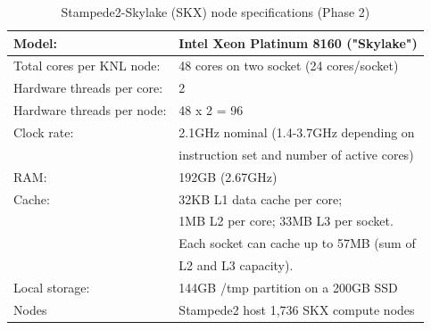 \documentclass{article}
\begin{document}
\begin{table}[!hpt]
\centering
\caption{Stampede2-Skylake (SKX) node specifications (Phase 2)\cite{TACC_Stampede2}}
\begin{tabular}{|l|l|}\hline 
Model:                     & Intel Xeon Platinum 8160 ("Skylake")\\ \hline
Total cores per KNL node:  & 48 cores on two socket (24 cores/socket)\\ \hline
Hardware threads per core: & 2\\\hline 
Hardware threads per node: & 48 x 2 = 96\\\hline 
Clock rate: 	           & 2.1GHz nominal (1.4-3.7GHz depending on\\
                           & instruction set and number of active cores)\\\hline
RAM: 	                   & 192GB (2.67GHz)\\\hline 
Cache:                     & 32KB L1 data cache per core;\\
                           & 1MB L2 per core; 33MB L3 per socket.\\
                           & Each socket can cache up to 57MB (sum of\\
                           & L2 and L3 capacity).\\\hline
Local storage:             & 144GB /tmp partition on a 200GB SSD\\\hline 
Nodes                      & Stampede2 host 1,736 SKX compute nodes\\ \hline
\end{tabular}
\label{TACC_Stampede2_2}
\end{table}
\end{document}
